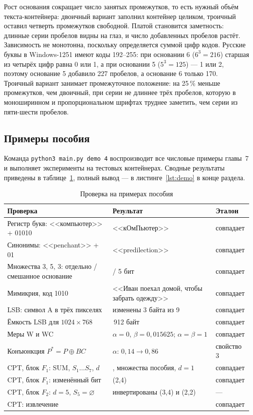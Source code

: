\documentclass[14pt,a4paper]{extarticle}
\begin{document}
Рост основания сокращает число занятых промежутков, то есть нужный объём
текста-контейнера: двоичный вариант заполнил контейнер целиком, троичный оставил
четверть промежутков свободной. Платой становится заметность: длинные серии
пробелов видны на глаз, и число добавленных пробелов растёт. Зависимость не
монотонна, поскольку определяется суммой цифр кодов. Русские буквы в Windows-1251
имеют коды 192--255: при основании 6 ($6^3 = 216$) старшая из четырёх цифр равна 0
или 1, а при основании 5 ($5^3 = 125$) --- 1 или 2, поэтому основание 5 добавило
227 пробелов, а основание 6 только 170. Троичный вариант занимает промежуточное
положение: на 25\,\% меньше промежутков, чем двоичный, при серии не длиннее трёх
пробелов, которую в моноширинном и пропорциональном шрифтах труднее заметить, чем
серии из пяти-шести пробелов.

\subsection{Примеры пособия}

Команда \texttt{python3 main.py demo 4} воспроизводит все числовые примеры главы~7 и
выполняет эксперименты на тестовых контейнерах. Сводные результаты приведены в
таблице~\ref{tab:results}, полный вывод --- в листинге~\ref{lst:demo} в конце раздела.

\begin{table}[H]
\caption{Проверка на примерах пособия}
\label{tab:results}
\centering
\begin{tabularx}{\textwidth}{X>{\raggedright\arraybackslash}p{6.2cm}l}
\toprule
Проверка & Результат & Эталон \\
\midrule
Регистр букв: <<компьютер>> + 01010 & <<кОмПьютер>> & совпадает \\
Синонимы: <<penchant>> + 01 & <<predilection>> & совпадает \\
Множества 3, 5, 3: отдельно / смешанное основание & 4 / 5 бит & совпадает \\
Мимикрия, код 1010 & <<Иван поехал домой, чтобы забрать одежду>> & совпадает \\
LSB: символ A в трёх пикселях & изменены 3 байта из 9 & совпадает \\
Ёмкость LSB для $1024 \times 768$ & 294\,912 байт & совпадает \\
Меры W и WC & $\alpha = 0$, $\beta = 0{,}015625$; $\alpha = \beta = 1$ & совпадает \\
Конъюнкция $P^* = P \oplus BC$ & $\alpha$: $0{,}14 \to 0{,}86$ & свойство 3 \\
CPT, блок $F_1$: SUM, $S_1 \ldots S_7$, $d$ & 0, множества пособия, $d = 1$ & совпадает \\
CPT, блок $F_1$: изменённый бит & (2,4) & совпадает \\
CPT, блок $F_2$: $d = 5$, $S_5 = \varnothing$ & инвертированы (3,4) и (2,2) & --- \\
CPT: извлечение & 001001 & совпадает \\
\bottomrule
\end{tabularx}
\end{table}
\end{document}
